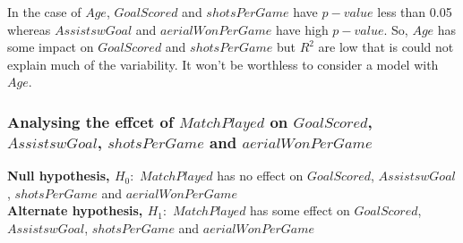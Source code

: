 \documentclass[12pt]{article}
\begin{document}
In the case of $ Age $, $ GoalScored $ and $ shotsPerGame $ have $ p-value $ less than 0.05 whereas $ AssistswGoal $ and $ aerialWonPerGame $ have high $ p-value $. So, $ Age $ has some impact on $ GoalScored $ and $ shotsPerGame $ but $ R^2 $ are low that is could not explain much of the variability. It won't be worthless to consider a model with $ Age $.

\newpage

\subsubsection{Analysing the effcet of $ MatchPlayed $ on $ GoalScored $, \\ $ AssistswGoal $, $ shotsPerGame $ and $ aerialWonPerGame $}

\textbf{Null hypothesis, $ H_0: $} $ MatchPlayed $ has no effect on $ GoalScored $, $ AssistswGoal $, $ shotsPerGame $ and $ aerialWonPerGame $\\
\textbf{Alternate hypothesis, $ H_1: $} $ MatchPlayed $ has some effect on $ GoalScored $, $ AssistswGoal $, $ shotsPerGame $ and $ aerialWonPerGame $
\end{document}

